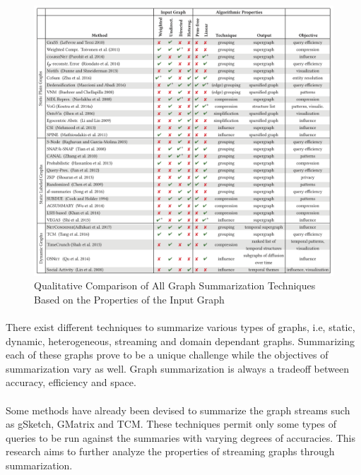 \begin{figure}[H]
    \centering
    \includegraphics[width=\textwidth]{images/sum}
    \caption{Qualitative Comparison of All Graph Summarization Techniques Based on the Properties of the Input Graph\cite{liu_graph_2018}}
\end{figure}

\paragraph{}
There exist different techniques to summarize 
various types of graphs, i.e, static, dynamic, heterogeneous, streaming and 
domain dependant graphs. Summarizing each of these graphs prove to be a unique 
challenge while the objectives of summarization vary as well. Graph summarization 
is always a tradeoff between accuracy, efficiency and space. 

\paragraph{}
Some methods have already been devised to summarize the graph streams such 
as gSketch\cite{zhao_gsketch:_2011}, 
GMatrix\cite{khan_query-friendly_2016} and TCM\cite{tang_graph_2016}. 
These techniques permit only some types of queries 
to be run against the summaries with varying degrees of accuracies. This 
research aims to further analyze the properties of streaming graphs through 
summarization.


